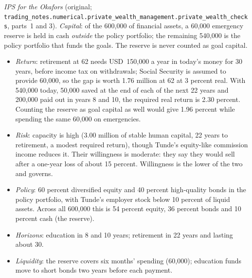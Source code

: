 \begin{qfmethod}
 \emph{IPS for the Okafors} (original; \nolinkurl{trading_notes.numerical.private_wealth_management.private_wealth_checks}, parts~1 and 3). \emph{Capital}: of the 600,000 of financial assets, a 60,000 emergency reserve is held in cash \emph{outside} the policy portfolio; the remaining 540,000 is the policy portfolio that funds the goals. The reserve is never counted as goal capital.
\begin{itemize}
\item \emph{Return}: retirement at 62 needs USD~150,000 a year in today's money for 30 years, before income tax on withdrawals; Social Security is assumed to provide 60,000, so the gap is worth 1.76 million at 62 at 3 percent real. With 540,000 today, 50,000 saved at the end of each of the next 22 years and 200,000 paid out in years 8 and 10, the required real return is 2.30 percent. Counting the reserve as goal capital as well would give 1.96 percent while spending the same 60,000 on emergencies.
\item \emph{Risk}: capacity is high (3.00 million of stable human capital, 22 years to retirement, a modest required return), though Tunde's equity-like commission income reduces it. Their willingness is moderate: they say they would sell after a one-year loss of about 15 percent. Willingness is the lower of the two and governs.
\item \emph{Policy}: 60 percent diversified equity and 40 percent high-quality bonds in the policy portfolio, with Tunde's employer stock below 10 percent of liquid assets. Across all 600,000 this is 54 percent equity, 36 percent bonds and 10 percent cash (the reserve).
\item \emph{Horizons}: education in 8 and 10 years; retirement in 22 years and lasting about 30.
\item \emph{Liquidity}: the reserve covers six months' spending (60,000); education funds move to short bonds two years before each payment.

\end{itemize}
\end{qfmethod}
